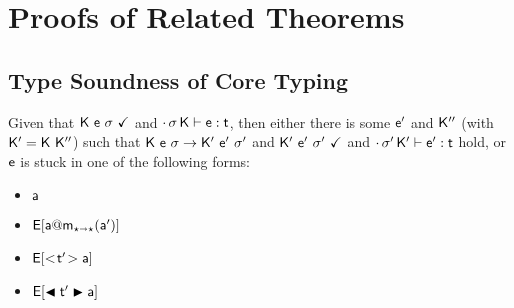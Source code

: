 \documentclass[acmlarge, anonymous, authordraft, review]{acmart} %
\begin{document}
% 

\section{Proofs of Related Theorems}

\subsection*{Type Soundness of Core \kafka Typing}

Given that $\WFp\K{\e~\s}$ and $\EnvType\cdot\s\K\e\t$, then either there is some $\ep$ and ${{\sf{K''}}}$ (with ${{\sf{K'}}} = {\sf{K}}~{{\sf{K''}}}$) 
such that $\Reduce \K\e\s \Kp\ep\sp$ and $\WFp\Kp{\ep~\sp}$ and $\EnvType\cdot\sp\Kp\ep\t$ hold, 
or $\e$ is stuck in one of the following forms:
\begin{itemize} 
\item $\a$
\item $\EE[\DynCall\a\m{\ap}]$
\item $\EE[\SubCast\tp\a]$
\item $\EE[\BehCast\tp\a]$
\end{itemize}
\end{document}
